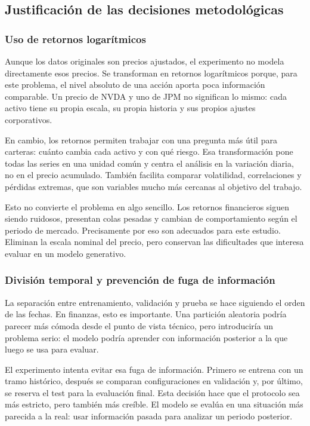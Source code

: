 \documentclass[11pt,a4paper,spanish,oneside]{book}
\numberwithin{equation}{chapter}
\numberwithin{figure}{chapter}
\begin{document}
\subsection{Justificación de las decisiones metodológicas}

\subsubsection{Uso de retornos logarítmicos}

Aunque los datos originales son precios ajustados, el experimento no modela directamente esos precios. Se transforman en retornos logarítmicos porque, para este problema, el nivel absoluto de una acción aporta poca información comparable. Un precio de NVDA y uno de JPM no significan lo mismo: cada activo tiene su propia escala, su propia historia y sus propios ajustes corporativos.

En cambio, los retornos permiten trabajar con una pregunta más útil para carteras: cuánto cambia cada activo y con qué riesgo. Esa transformación pone todas las series en una unidad común y centra el análisis en la variación diaria, no en el precio acumulado. También facilita comparar volatilidad, correlaciones y pérdidas extremas, que son variables mucho más cercanas al objetivo del trabajo.

Esto no convierte el problema en algo sencillo. Los retornos financieros siguen siendo ruidosos, presentan colas pesadas y cambian de comportamiento según el periodo de mercado. Precisamente por eso son adecuados para este estudio. Eliminan la escala nominal del precio, pero conservan las dificultades que interesa evaluar en un modelo generativo.

\subsubsection{División temporal y prevención de fuga de información}

La separación entre entrenamiento, validación y prueba se hace siguiendo el orden de las fechas. En finanzas, esto es importante. Una partición aleatoria podría parecer más cómoda desde el punto de vista técnico, pero introduciría un problema serio: el modelo podría aprender con información posterior a la que luego se usa para evaluar.

El experimento intenta evitar esa fuga de información. Primero se entrena con un tramo histórico, después se comparan configuraciones en validación y, por último, se reserva el test para la evaluación final. Esta decisión hace que el protocolo sea más estricto, pero también más creíble. El modelo se evalúa en una situación más parecida a la real: usar información pasada para analizar un periodo posterior.
\end{document}
